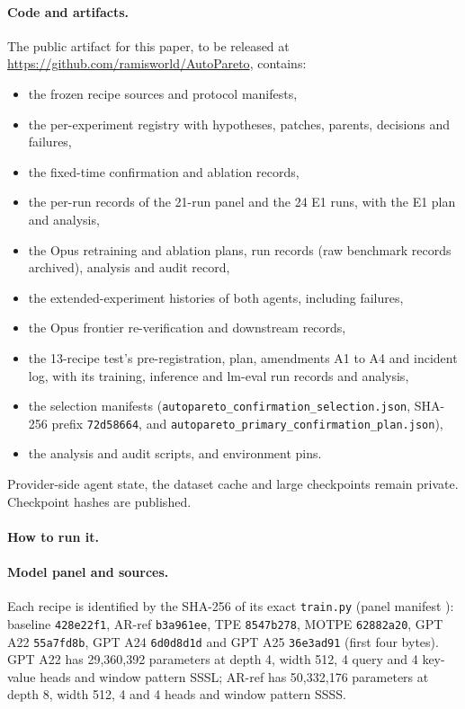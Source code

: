 \documentclass{article}
\newif\ifshowhumanmarkers \showhumanmarkersfalse
\newcommand{\releasepending}{\ifshowhumanmarkers{\color{humanframe}\sffamily\scriptsize\bfseries[RELEASE PENDING]}\ \fi}
\begin{document}
\paragraph{Code and artifacts.} \releasepending The public artifact for this paper, to be released at \url{https://github.com/ramisworld/AutoPareto}, contains:
{\setlength{\leftmargini}{1.2em}\begin{itemize}\setlength{\itemsep}{0pt}\setlength{\parskip}{0pt}\setlength{\topsep}{2pt}
\item the frozen recipe sources and protocol manifests,
\item the per-experiment registry with hypotheses, patches, parents, decisions and failures,
\item the fixed-time confirmation and ablation records,
\item the per-run records of the 21-run panel and the 24 E1 runs, with the E1 plan and analysis,
\item the Opus retraining and ablation plans, run records (raw benchmark records archived), analysis and audit record,
\item the extended-experiment histories of both agents, including failures,
\item the Opus frontier re-verification and downstream records,
\item the 13-recipe test's pre-registration, plan, amendments A1 to A4 and incident log, with its training, inference and lm-eval run records and analysis,
\item the selection manifests (\texttt{autopareto\_confirmation\_selection.json}, SHA-256 prefix \texttt{72d58664}, and \texttt{autopareto\_primary\_confirmation\_plan.json}),
\item the analysis and audit scripts, and environment pins.
\end{itemize}}
Provider-side agent state, the dataset cache and large checkpoints remain private. Checkpoint hashes are published.

\paragraph{How to run it.}\label{app:howto} 

\paragraph{Model panel and sources.} Each recipe is identified by the SHA-256 of its exact \texttt{train.py} (panel manifest ): baseline \texttt{428e22f1}, AR-ref \texttt{b3a961ee}, TPE \texttt{8547b278}, MOTPE \texttt{62882a20}, GPT A22 \texttt{55a7fd8b}, GPT A24 \texttt{6d0d8d1d} and GPT A25 \texttt{36e3ad91} (first four bytes). GPT A22 has 29,360,392 parameters at depth 4, width 512, 4 query and 4 key-value heads and window pattern SSSL; AR-ref has 50,332,176 parameters at depth 8, width 512, 4 and 4 heads and window pattern SSSS.
\end{document}
